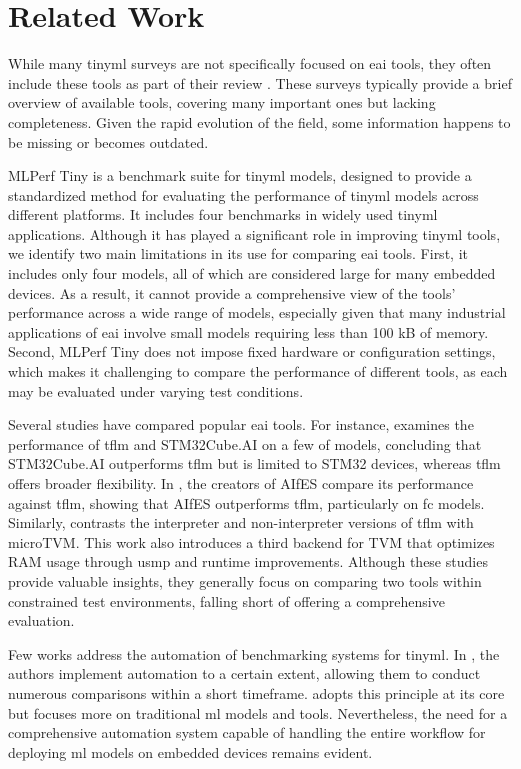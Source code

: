 \section{Related Work}
\label{sec:related_work}

While many \gls{tinyml} surveys are not specifically focused on \gls{eai} tools, they often include these tools as part of their review \cite{Tsoukas2024, Immonen2022, Njor2024, Sanchez2020, Ray2022, Saha2022, Capogrosso2024, Abadade2023}. These surveys typically provide a brief overview of available tools, covering many important ones but lacking completeness. Given the rapid evolution of the field, some information happens to be missing or becomes outdated.

MLPerf Tiny \cite{Banbury2020} is a benchmark suite for \gls{tinyml} models, designed to provide a standardized method for evaluating the performance of \gls{tinyml} models across different platforms. It includes four benchmarks in widely used \gls{tinyml} applications. Although it has played a significant role in improving \gls{tinyml} tools, we identify two main limitations in its use for comparing \gls{eai} tools. First, it includes only four models, all of which are considered large for many embedded devices. As a result, it cannot provide a comprehensive view of the tools' performance across a wide range of models, especially given that many industrial applications of \gls{eai} involve small models requiring less than 100 kB of memory. Second, MLPerf Tiny does not impose fixed hardware or configuration settings, which makes it challenging to compare the performance of different tools, as each may be evaluated under varying test conditions.

Several studies have compared popular \gls{eai} tools. For instance, \cite{Osman2022} examines the performance of \gls{tflm} and STM32Cube.AI on a few of models, concluding that STM32Cube.AI outperforms \gls{tflm} but is limited to STM32 devices, whereas \gls{tflm} offers broader flexibility. In \cite{Wulfert2024}, the creators of AIfES compare its performance against \gls{tflm}, showing that AIfES outperforms \gls{tflm}, particularly on \gls{fc} models. Similarly, \cite{MLonMCU} contrasts the interpreter and non-interpreter versions of \gls{tflm} with microTVM. This work also introduces a third backend for TVM that optimizes RAM usage through \gls{usmp} and runtime improvements. Although these studies provide valuable insights, they generally focus on comparing two tools within constrained test environments, falling short of offering a comprehensive evaluation.

Few works address the automation of benchmarking systems for \gls{tinyml}. In \cite{MLonMCU}, the authors implement automation to a certain extent, allowing them to conduct numerous comparisons within a short timeframe. \cite{Baciu2024} adopts this principle at its core but focuses more on traditional \gls{ml} models and tools. Nevertheless, the need for a comprehensive automation system capable of handling the entire workflow for deploying \gls{ml} models on embedded devices remains evident.